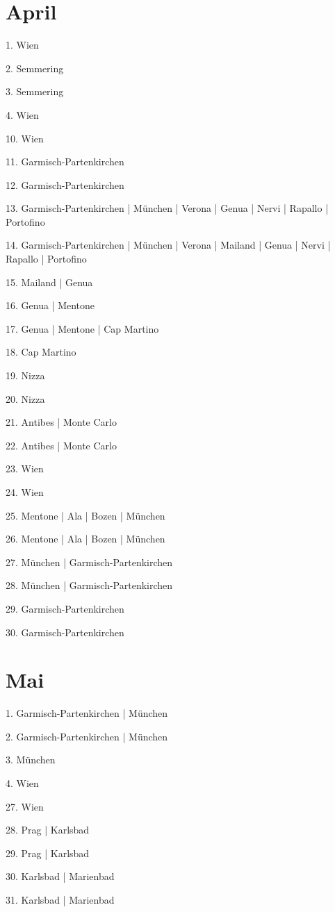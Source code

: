 \documentclass[twoside=false,titlepage=false,open=any, parskip=never, fontsize=10pt, headings=small, chapterprefix=false, appendixprefix=false, DIV=15]{scrbook}
\begin{document}
\begin{multicols}{3}
            \section*{April}
            1. Wien\par
            2. Semmering\par
            3. Semmering\par
            4. Wien\par
            10. Wien\par
            11. Garmisch-Partenkirchen\par
            12. Garmisch-Partenkirchen\par
            13. Garmisch-Partenkirchen | München | Verona | Genua | Nervi | Rapallo | Portofino\par
            14. Garmisch-Partenkirchen | München | Verona | Mailand | Genua | Nervi | Rapallo | Portofino\par
            15. Mailand | Genua\par
            16. Genua | Mentone\par
            17. Genua | Mentone | Cap Martino\par
            18. Cap Martino\par
            19. Nizza\par
            20. Nizza\par
            21. Antibes | Monte Carlo\par
            22. Antibes | Monte Carlo\par
            23. Wien\par
            24. Wien\par
            25. Mentone | Ala | Bozen | München\par
            26. Mentone | Ala | Bozen | München\par
            27. München | Garmisch-Partenkirchen\par
            28. München | Garmisch-Partenkirchen\par
            29. Garmisch-Partenkirchen\par
            30. Garmisch-Partenkirchen\par
            \section*{Mai}
            1. Garmisch-Partenkirchen | München\par
            2. Garmisch-Partenkirchen | München\par
            3. München\par
            4. Wien\par
            27. Wien\par
            28. Prag | Karlsbad\par
            29. Prag | Karlsbad\par
            30. Karlsbad | Marienbad\par
            31. Karlsbad | Marienbad\par

\end{multicols}
\end{document}
